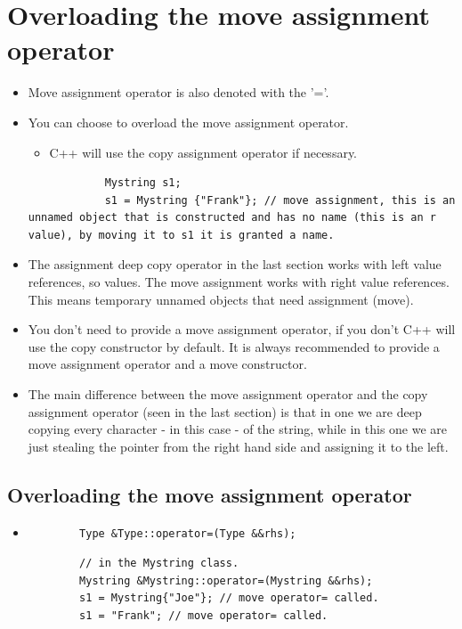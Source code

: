 \section{Overloading the move assignment operator}
\begin{itemize}
    \item Move assignment operator is also denoted with the '='.
    \item You can choose to overload the move assignment operator.
        \begin{itemize}
            \item C++ will use the copy assignment operator if necessary.
        \end{itemize}
        \begin{verbatim}
            Mystring s1;
            s1 = Mystring {"Frank"}; // move assignment, this is an unnamed object that is constructed and has no name (this is an r value), by moving it to s1 it is granted a name.
        \end{verbatim}
    
    \item The assignment deep copy operator in the last section works with left value references, so values. The move assignment works with right value references. This means temporary unnamed objects that need assignment (move). 
    \item You don't need to provide a move assignment operator, if you don't C++ will use the copy constructor by default. It is always recommended to provide a move assignment operator and a move constructor.
    \item The main difference between the move assignment operator and the copy assignment operator (seen in the last section) is that in one we are deep copying every character - in this case - of the string, while in this one we are just stealing the pointer from the right hand side and assigning it to the left.
\end{itemize}

\subsection{Overloading the move assignment operator}
\begin{itemize}
    \item \begin{verbatim}
        Type &Type::operator=(Type &&rhs);
    \end{verbatim}
    \begin{verbatim}
        // in the Mystring class.
        Mystring &Mystring::operator=(Mystring &&rhs);
        s1 = Mystring{"Joe"}; // move operator= called.
        s1 = "Frank"; // move operator= called.
    \end{verbatim}
\end{itemize}


